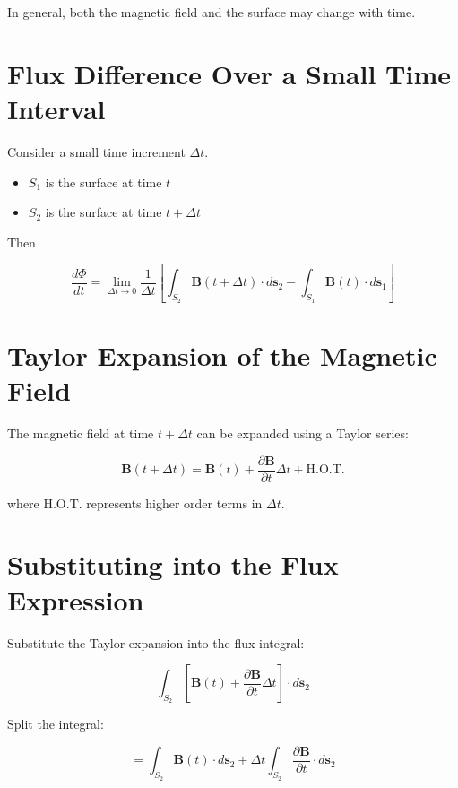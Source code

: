 \documentclass[12pt, a4paper]{article}
\begin{document}
In general, both the magnetic field and the surface may change with time.

\section{Flux Difference Over a Small Time Interval}

Consider a small time increment $\Delta t$.

\begin{itemize}
\item $S_1$ is the surface at time $t$
\item $S_2$ is the surface at time $t+\Delta t$
\end{itemize}

Then

\begin{equation}
\frac{d\Phi}{dt}
=
\lim_{\Delta t\rightarrow0}
\frac{1}{\Delta t}
\left[
\int_{S_2}\mathbf{B}(t+\Delta t)\cdot d\mathbf{s}_2
-
\int_{S_1}\mathbf{B}(t)\cdot d\mathbf{s}_1
\right]
\end{equation}

\section{Taylor Expansion of the Magnetic Field}

The magnetic field at time $t+\Delta t$ can be expanded using a Taylor series:

\begin{equation}
\mathbf{B}(t+\Delta t)
=
\mathbf{B}(t)
+
\frac{\partial \mathbf{B}}{\partial t}\Delta t
+
\text{H.O.T.}
\end{equation}

where H.O.T. represents higher order terms in $\Delta t$.

\section{Substituting into the Flux Expression}

Substitute the Taylor expansion into the flux integral:

\begin{equation}
\int_{S_2}
\left[
\mathbf{B}(t)
+
\frac{\partial \mathbf{B}}{\partial t}\Delta t
\right]
\cdot d\mathbf{s}_2
\end{equation}

Split the integral:

\begin{equation}
=
\int_{S_2}\mathbf{B}(t)\cdot d\mathbf{s}_2
+
\Delta t
\int_{S_2}
\frac{\partial \mathbf{B}}{\partial t}\cdot d\mathbf{s}_2
\end{equation}
\end{document}

